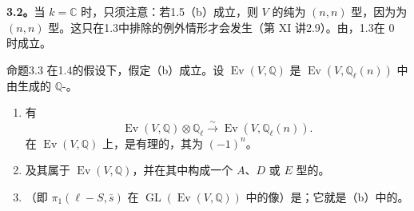 \textbf{3.2。}当 $k=\mathbb C$ 时，只须注意：若1.5（b）成立，则 $V$ 的纯为 $(n,n)$ 型，因为为 $(n,n)$ 型。这只在1.3中排除的例外情形才会发生（第 XI 讲2.9）。由，1.3在 $0$ 时成立。

\begin{SGAresult}{命题}{3.3}
在1.4的假设下，假定（b）成立。设 $\operatorname{Ev}(V,\mathbb Q)$ 是 $\operatorname{Ev}(V,\mathbb Q_\ell(n))$ 中由生成的 $\mathbb Q$-。
\begin{enumerate}
\item[(a)] 有
\[
\operatorname{Ev}(V,\mathbb Q)\otimes\mathbb Q_\ell
\xrightarrow{\sim}\operatorname{Ev}(V,\mathbb Q_\ell(n)).
\]
在 $\operatorname{Ev}(V,\mathbb Q)$ 上，是有理的，其为 $(-1)^n$。
\item[(b)] 及其属于 $\operatorname{Ev}(V,\mathbb Q)$，并在其中构成一个 $A$、$D$ 或 $E$ 型的。
\item[(c)] （即 $\pi_1(\ell-S,\bar s)$ 在 $\operatorname{GL}(\operatorname{Ev}(V,\mathbb Q))$ 中的像）是；它就是（b）中的。
\end{enumerate}
\end{SGAresult}
